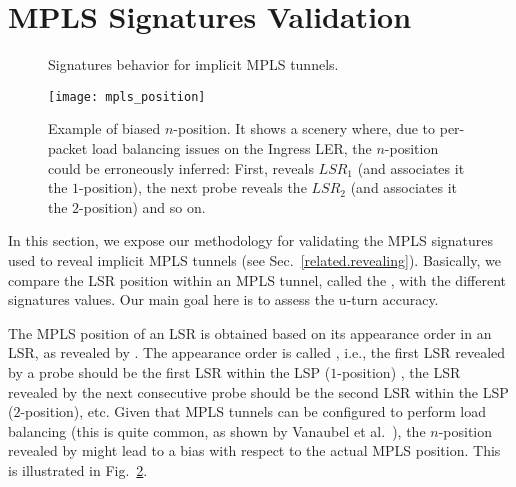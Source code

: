 \section{MPLS Signatures Validation}\label{validation}
\begin{figure}[!t]
  \begin{center}
\hspace{-0.3cm}      
  \end{center}
\vspace{-0.5cm}  
  \caption{Signatures behavior for implicit MPLS tunnels.}
  \label{validation.signatures.fig}
\end{figure}

\begin{figure}[!t]
  \begin{center}
    \texttt{[image: mpls\_position]}
  \end{center}
\vspace{-0.5cm}  
  \caption{Example of biased $n$-position. 
  It shows a scenery where, due to per-packet load balancing issues on the
  Ingress LER, the $n$-position could be erroneously inferred: First,
  \traceroute reveals  $LSR_{1}$ (and associates it the $1$-position), the next
  \traceroute probe reveals the $LSR_{2}$ (and associates it the $2$-position)
  and so on.}
  \label{validation.MPLSpositionFig}
\end{figure}

In this section, we expose our methodology for validating the MPLS signatures
used to reveal implicit MPLS tunnels (see Sec.~\ref{related.revealing}).
Basically, we compare the LSR position within an MPLS tunnel, called the
, with the different signatures values. Our main goal here is
to assess the u-turn accuracy.

The MPLS position of an LSR is obtained based on its appearance order in an LSR,
as revealed by \traceroute.  The appearance order is called ,
i.e., the first LSR revealed by a \traceroute probe should be the first LSR
within the LSP ($1$-position) , the LSR revealed by the next consecutive
\traceroute probe should be the second LSR within the LSP ($2$-position), etc.
Given that MPLS tunnels can be configured to perform load balancing (this is
quite common, as shown by Vanaubel et al.~\cite{Vanaubel15}), the $n$-position
revealed by \traceroute might lead to a bias with respect to the actual MPLS
position. This is illustrated in Fig.~\ref{validation.MPLSpositionFig}.

